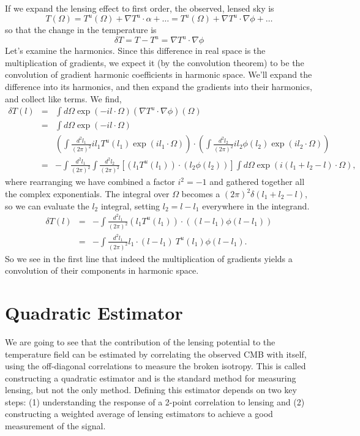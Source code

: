 If we expand the lensing effect to first order, the observed, lensed sky is
\begin{equation}
  T(\Omega) = T^u(\Omega) + \nabla{ T^u} \cdot {\alpha} + \dots =  T^u(\Omega) + \nabla T^u \cdot \nabla \phi + \dots
\end{equation}
so that the change in the temperature is
\begin{equation}
\delta T = T - T^u =  \nabla T^u \cdot \nabla \phi
\end{equation}
Let's examine the harmonics.  Since this difference in real space is the multiplication of gradients, we expect it (by the convolution theorem) to be the convolution of gradient harmonic coefficients in harmonic space.  We'll expand the difference into its harmonics, and then expand the gradients into their harmonics, and collect like terms.  We find,
\begin{eqnarray}
  \delta T(l) &=& \int d\Omega \exp(-il \cdot \Omega)  (\nabla T^u \cdot \nabla \phi)(\Omega)\\ \nonumber
   &=& \int d\Omega \exp(-il \cdot \Omega)  \\ \nonumber
   && \left( \int \frac{d^2 l_1}{(2\pi)^2} il_1 T^u(l_1) \exp(il_1\cdot\Omega)  \right) %
  \cdot  \left( \int \frac{d^2 l_2}{(2\pi)^2} il_2 \phi(l_2) \exp(il_2\cdot\Omega)  \right) \\ \nonumber
  &=& - \int \frac{d^2 l_1}{(2\pi)^2} \int \frac{d^2 l_2}{(2\pi)^2}  \left[ (l_1 T^u(l_1))\cdot(l_2 \phi(l_2))\right]  \int d\Omega\exp\left(i(l_1+l_2 - l)\cdot\Omega\right),
\end{eqnarray}
where rearranging we have combined a factor $i^2 = -1$ and gathered together all the complex exponentials.  The integral over $\Omega$ becomes a $(2\pi)^2 \delta(l_1 + l_2 - l)$, so we can evaluate the $l_2$ integral, setting $l_2 = l - l_1$ everywhere in the integrand.
\begin{eqnarray}
  \delta T(l) &=& -\int \frac{d^2 l_1}{(2\pi)^2} \left(l_1 T^u(l_1) \right) \cdot \left((l - l_1) \phi(l - l_1) \right) \\ \nonumber
  &=& -\int \frac{d^2 l_1}{(2\pi)^2} l_1\cdot(l-l_1) \ T^u(l_1) \phi(l - l_1). 
\end{eqnarray}
So we see in the first line that indeed the multiplication of gradients yields a convolution of their components in harmonic space.


\section{Quadratic Estimator}
We are going to see that the contribution of the lensing potential to the temperature field can be estimated by correlating the observed CMB with itself, using the off-diagonal correlations to measure the broken isotropy.  This is called constructing a quadratic estimator and is the standard method for measuring lensing, but not the only method.  Defining this estimator depends on two key steps: (1) understanding the response of a 2-point correlation to lensing and (2) constructing a weighted average of lensing estimators to achieve a good measurement of the signal.


